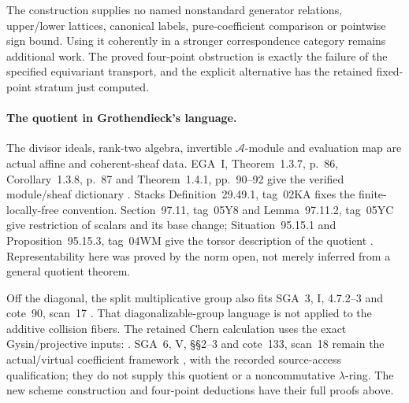 The construction supplies no named nonstandard
generator relations, upper/lower lattices,
canonical labels, pure-coefficient comparison
or pointwise sign bound.
Using it coherently in a stronger correspondence
category remains additional work.
The proved four-point obstruction is exactly the
failure of the specified equivariant transport,
and the explicit alternative has the retained
fixed-point stratum just computed.

\paragraph{The  quotient in Grothendieck's language.}
The divisor ideals, rank-two algebra, invertible
\(\mathcal A\)-module and evaluation map are actual
affine and coherent-sheaf data.
EGA~I, Theorem~1.3.7, p.~86, Corollary~1.3.8,
p.~87 and Theorem~1.4.1, pp.~90--92 give the
verified module/sheaf dictionary \cite{EGA}.
Stacks Definition~29.49.1, tag~02KA fixes
the finite-locally-free convention.
Section~97.11, tag~05Y8 and Lemma~97.11.2,
tag~05YC give restriction of scalars and its
base change; Situation~95.15.1 and
Proposition~95.15.3, tag~04WM give the torsor
description of the quotient
\cite{StacksVariableQuotients}.
Representability here was proved by the norm open,
not merely inferred from a general quotient theorem.

Off the diagonal, the split multiplicative group
also fits SGA~3, I, 4.7.2--3 and cote~90,
scan~17 \cite{SGA3,Archive}.
That diagonalizable-group language is not applied
to the additive collision fibers.
The retained Chern calculation uses the exact
 Gysin/projective inputs:
\cite[Theorem~16.1 and Corollary~16.2, p.~108;
Theorem~23.2, pp.~139--140]{Milne}.
SGA~6, V, \S\S2--3 and cote~133, scan~18
remain the actual/virtual coefficient framework
\cite{SGA6,Archive}, with the recorded source-access
qualification; they do not supply this quotient
or a noncommutative \(\lambda\)-ring.
The new scheme construction and four-point
deductions have their full proofs above.
